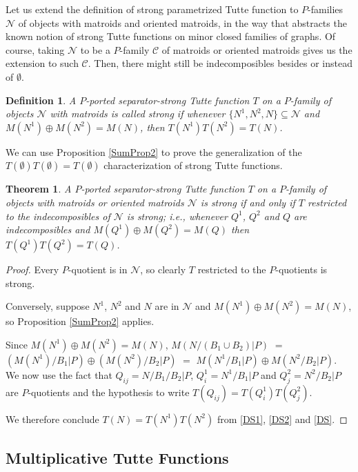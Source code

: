 \documentclass[12pt,leqno]{amsart}
\newtheorem{thm}[lem]{Theorem}
\newtheorem{definition}[lem]{Definition}
\theoremstyle{remark}
\begin{document}
Let us extend the definition of strong parametrized Tutte function
to $P$-families $\mathcal{N}$ of objects with matroids and oriented matroids,
in the way that abstracts the known notion of strong Tutte functions
on minor closed families of graphs\cite{Ellis-Monaghan-Traldi}.
Of course, taking $\mathcal{N}$ to be a $P$-family $\mathcal{C}$ of 
matroids or oriented matroids gives us the extension to such $\mathcal{C}$.
Then, there might still be indecomposibles besides or instead of $\emptyset$.

\begin{definition}
A $P$-ported separator-strong Tutte function $T$ on a $P$-family of 
objects $\mathcal{N}$
with matroids is called \emph{strong} if
whenever $\{N^1, N^2, N\}\subseteq\mathcal{N}$
and 
$M(N^1)\oplus M(N^2)=M(N)$, 
then $T(N^1)T(N^2)=T(N)$.
\end{definition}


We can use Proposition \ref{SumProp2}
to prove the generalization of
the $T(\emptyset)T(\emptyset)=T(\emptyset)$ 
characterization of strong Tutte
functions.

\begin{thm}
\label{StrongTheorem}
A $P$-ported separator-strong Tutte function $T$ on a $P$-family of 
objects 
with matroids or oriented matroids $\mathcal{N}$ 
is \emph{strong} if and only if
$T$ restricted to the indecomposibles of 
$\mathcal{N}$ is strong; i.e.,
whenever $Q^1$, $Q^2$ and 
$Q$ are indecomposibles and $M(Q^1)\oplus M(Q^2)=M(Q)$ then
$T(Q^1)T(Q^2)=T(Q)$.
\end{thm}

\begin{proof}
Every $P$-quotient is in $\mathcal{N}$, so clearly $T$ restricted
to the $P$-quotients is strong.

Conversely, suppose $N^1$, $N^2$ and $N$ are in $\mathcal{N}$ and
$M(N^1)\oplus M(N^2)=M(N)$, so Proposition \ref{SumProp2} applies.

Since $M(N^1)\oplus M(N^2)=M(N)$, 
$M(N/(B_1\cup B_2)|P)$ $=$ $(M(N^1)/B_1|P)\oplus (M(N^2)/B_2|P)$
$=$ $M(N^1/B_1|P)\oplus M(N^2/B_2|P)$.  
We now use the fact
that $Q_{ij}=N/B_1/B_2|P$, $Q^1_i=N^1/B_1|P$ and $Q^2_j=N^2/B_2|P$ are 
$P$-quotients and the hypothesis to
write $T(Q_{ij})=T(Q^1_i)T(Q^2_j)$.  


We therefore conclude $T(N)=T(N^1)T(N^2)$
from \eqref{DS1}, \eqref{DS2} and  \eqref{DS}.

\end{proof}

\subsection{Multiplicative Tutte Functions}
\end{document}
